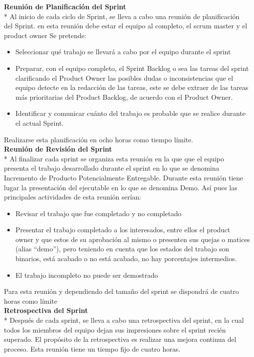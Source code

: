 \documentclass[../pfc.tex]{subfiles}
\begin{document}
	\textbf{Reunión de Planificación del Sprint }\\*
	Al inicio de cada ciclo de Sprint, se lleva a cabo una reunión de planificación del Sprint. en esta reunión debe estar el equipo al completo, el scrum master y el product owner Se pretende:
	\begin{itemize} 
		\item Seleccionar qué trabajo se llevará a cabo por el equipo durante el sprint 
		\item Preparar, con el equipo completo, el Sprint Backlog o sea las tareas del sprint clarificando el Product Owner las posibles dudas o  inconsistencias que el equipo detecte en la redacción de las tareas, este se debe extraer de las tareas más prioritarias del Product Backlog, de acuerdo con el Product Owner. 
		\item Identificar y comunicar cuánto del trabajo es probable que se realice durante el actual Sprint.
	\end{itemize}
	
	Realizarse esta planificación en ocho horas como tiempo límite.\\
	
	\textbf{Reunión de Revisión del Sprint}\\*
	Al finalizar cada sprint se organiza esta reunión en la que que el equipo presenta el trabajo desarrollado durante el sprint en lo que se denomina Incremento de Producto Potencialmente Entregable. Durante esta reunión tiene lugar la presentación del ejecutable en lo que se denomina Demo. Así pues las principales actividades de esta reunión serían:
	\begin{itemize} 
		\item Revisar el trabajo que fue completado y no completado 
		\item 	Presentar el trabajo completado a los interesados, entre ellos el product owner y que estos de su aprobación al mismo o presenten sus quejas o matices (alias “demo”), pero teniendo en cuenta que los estados del trabajo son binarios, está acabado o no está acabado, no hay porcentajes intermedios. 
		\item El trabajo incompleto no puede ser demostrado 
	\end{itemize}
	
	Para esta reunión y dependiendo del tamaño del sprint se dispondrá de cuatro horas como límite\\
	
	\textbf{Retrospectiva del Sprint }\\*
	Después de cada sprint, se lleva a cabo una retrospectiva del sprint, en la cual todos los miembros del equipo dejan sus impresiones sobre el sprint recién superado. El propósito de la retrospectiva es realizar una mejora continua del proceso. Esta reunión tiene un tiempo fijo de cuatro horas.
	
\end{document}
